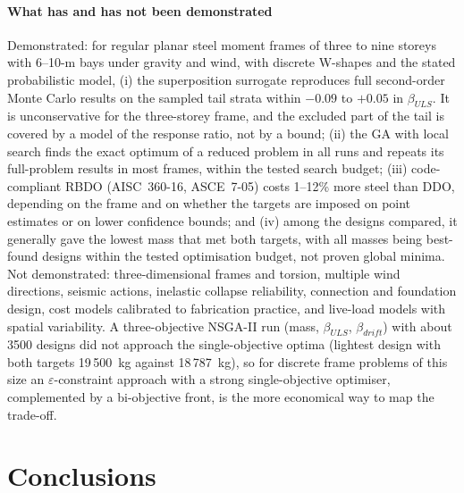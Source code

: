 \paragraph{What has and has not been demonstrated}
Demonstrated: for regular planar steel moment frames of three to nine storeys with 6--10-m bays under
gravity and wind, with discrete W-shapes and the stated probabilistic model,
(i) the superposition surrogate reproduces full second-order Monte Carlo results on the sampled
tail strata within $-0.09$ to $+0.05$ in $\beta_{ULS}$. It is unconservative for the three-storey
frame, and the excluded part of the tail is covered by a model of the response ratio, not by a bound;
(ii) the GA with local search finds the exact optimum of a reduced problem in all runs and repeats
its full-problem results in most frames, within the tested search budget;
(iii) code-compliant RBDO (AISC~360-16, ASCE~7-05) costs 1--12\% more steel than DDO, depending on the frame and on whether
the targets are imposed on point estimates or on lower confidence bounds; and
(iv) among the designs compared, it generally gave the lowest mass that met both targets, with all
masses being best-found designs within the tested optimisation budget, not proven global minima. Not demonstrated: three-dimensional
frames and torsion, multiple wind directions, seismic actions, inelastic collapse reliability,
connection and foundation design, cost models calibrated to fabrication practice, and live-load
models with spatial variability. A three-objective NSGA-II run (mass, $\beta_{ULS}$, $\beta_{drift}$)
with about 3500 designs did not approach the single-objective optima (lightest design with both
targets 19\,500~kg against 18\,787~kg), so for discrete frame problems of this size an
$\varepsilon$-constraint approach with a strong single-objective optimiser, complemented by a
bi-objective front, is the more economical way to map the trade-off.

\section{Conclusions}\label{sec:conclusions}


